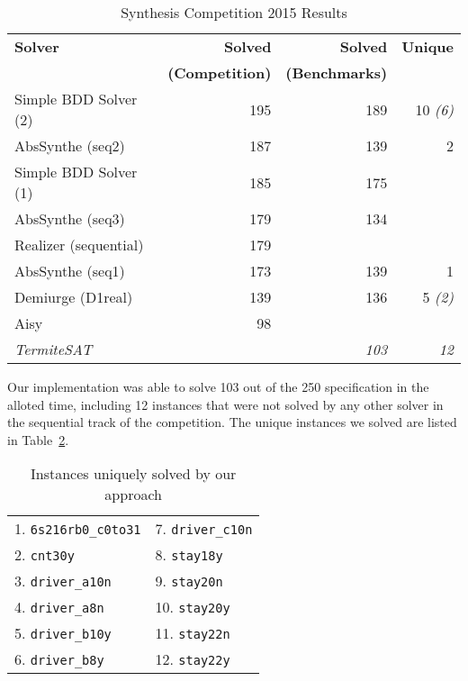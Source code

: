 \begin{table}[b]
    \centering
    \setlength{\tabcolsep}{8pt}
    \begin{tabular}{l r r r }
        \textbf{Solver} & \textbf{Solved} & \textbf{Solved} & \textbf{Unique} \\
                        & \textbf{(Competition)} & \textbf{(Benchmarks)} & \\
        \hline
        Simple BDD Solver (2) & 195 & 189 & 10 \textit{(6)} \\
        AbsSynthe (seq2) & 187 & 139 & 2 \\
        Simple BDD Solver (1) & 185 & 175 & \\
        AbsSynthe (seq3) & 179 & 134 & \\
        Realizer (sequential) & 179 & & \\
        AbsSynthe (seq1) & 173 & 139 & 1 \\
        Demiurge (D1real) & 139 & 136 & 5 \textit{(2)} \\
        Aisy & 98 & \\
        \textit{TermiteSAT} & & \textit{103} & \textit{12} \\
    \end{tabular}
    \caption{Synthesis Competition 2015 Results}
    \label{tab:syntcomp}
\end{table}

Our implementation was able to solve 103 out of the 250 specification in the alloted time, including 12 instances that were not solved by any other solver in the sequential track of the competition. The unique instances we solved are listed in Table~\ref{tab:unique}.

\begin{table}[h]
    \centering
    \setlength{\tabcolsep}{16pt}
    \begin{tabular}{l l}
        1. \texttt{6s216rb0\_c0to31} & 7. \texttt{driver\_c10n} \\
        2. \texttt{cnt30y} &  8. \texttt{stay18y} \\
        3. \texttt{driver\_a10n} & 9. \texttt{stay20n} \\
        4. \texttt{driver\_a8n} & 10. \texttt{stay20y} \\
        5. \texttt{driver\_b10y} & 11. \texttt{stay22n} \\
        6. \texttt{driver\_b8y} & 12. \texttt{stay22y} \\
    \end{tabular}
    \caption{Instances uniquely solved by our approach}
    \label{tab:unique}
\end{table}

